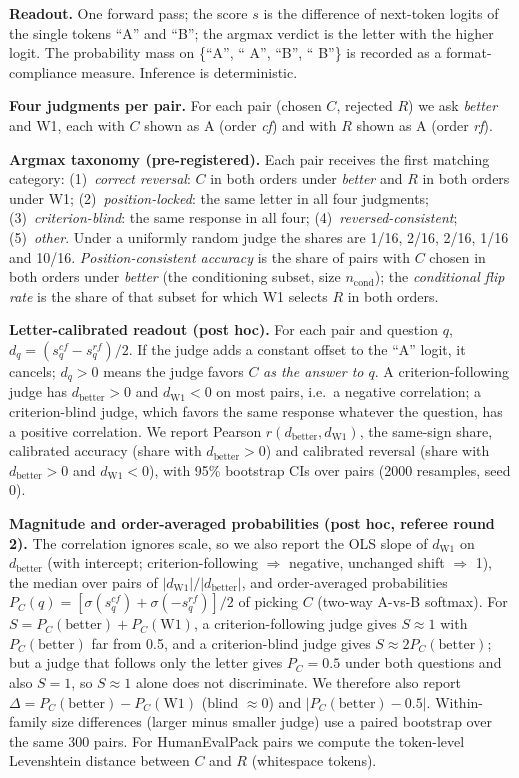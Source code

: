 \documentclass[conference]{IEEEtran}
\begin{document}
\textbf{Readout.} One forward pass; the score $s$ is the difference of next-token logits of the single tokens
``A'' and ``B''; the argmax verdict is the letter with the higher logit. The probability mass on \{``A'', `` A'',
``B'', `` B''\} is recorded as a format-compliance measure. Inference is deterministic.

\textbf{Four judgments per pair.} For each pair (chosen $C$, rejected $R$) we ask \emph{better} and W1, each with
$C$ shown as A (order \emph{cf}) and with $R$ shown as A (order \emph{rf}).

\textbf{Argmax taxonomy (pre-registered).} Each pair receives the first matching category: (1)~\emph{correct
reversal}: $C$ in both orders under \emph{better} and $R$ in both orders under W1; (2)~\emph{position-locked}:
the same letter in all four judgments; (3)~\emph{criterion-blind}: the same response in all four; (4)~\emph{reversed-consistent};
(5)~\emph{other}. Under a uniformly random judge the shares are 1/16, 2/16, 2/16, 1/16 and 10/16.
\emph{Position-consistent accuracy} is the share of pairs with $C$ chosen in both orders under \emph{better}
(the conditioning subset, size $n_\mathrm{cond}$); the \emph{conditional flip rate} is the share of that subset
for which W1 selects $R$ in both orders.

\textbf{Letter-calibrated readout (post hoc).} For each pair and question $q$,
$d_q = (s_q^{cf} - s_q^{rf})/2$. If the judge adds a constant offset to the ``A'' logit, it cancels; $d_q>0$
means the judge favors $C$ \emph{as the answer to $q$}. A criterion-following judge has $d_\mathrm{better}>0$
and $d_\mathrm{W1}<0$ on most pairs, i.e.\ a negative correlation; a criterion-blind judge, which favors the same
response whatever the question, has a positive correlation. We report Pearson $r(d_\mathrm{better},
d_\mathrm{W1})$, the same-sign share, calibrated accuracy (share with $d_\mathrm{better}>0$) and calibrated
reversal (share with $d_\mathrm{better}>0$ and $d_\mathrm{W1}<0$), with 95\% bootstrap CIs over pairs (2000
resamples, seed 0).

\textbf{Magnitude and order-averaged probabilities (post hoc, referee round 2).} The correlation ignores scale,
so we also report the OLS slope of $d_\mathrm{W1}$ on $d_\mathrm{better}$ (with intercept; criterion-following
$\Rightarrow$ negative, unchanged shift $\Rightarrow$ 1), the median over pairs of
$|d_\mathrm{W1}|/|d_\mathrm{better}|$, and order-averaged probabilities
$P_C(q)=[\sigma(s_q^{cf})+\sigma(-s_q^{rf})]/2$ of picking $C$ (two-way A-vs-B softmax). For
$S=P_C(\mathrm{better})+P_C(\mathrm{W1})$, a criterion-following judge gives $S\approx1$ with
$P_C(\mathrm{better})$ far from 0.5, and a criterion-blind judge gives $S\approx2P_C(\mathrm{better})$; but a judge
that follows only the letter gives $P_C=0.5$ under both questions and also $S=1$, so $S\approx1$ alone does not
discriminate. We therefore also report $\Delta=P_C(\mathrm{better})-P_C(\mathrm{W1})$ (blind $\approx0$) and
$|P_C(\mathrm{better})-0.5|$. Within-family size differences (larger minus smaller judge) use a paired bootstrap
over the same 300 pairs. For HumanEvalPack pairs we compute the token-level Levenshtein distance between $C$ and
$R$ (whitespace tokens).
\end{document}
